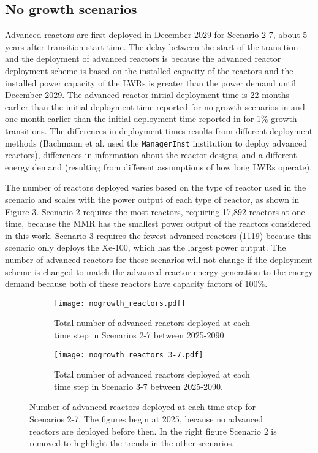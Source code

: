 \subsection{No growth scenarios} \label{sec:nogrowth_reactors}
Advanced reactors are first deployed in December 2029 for Scenario 2-7, 
about 5 years after transition start time. The delay between the start of 
the transition and the deployment of advanced reactors is because the 
advanced reactor deployment scheme is based on the installed capacity 
of the reactors and the
installed power capacity of the \glspl{LWR} is greater than the power demand
until December 2029. 
The advanced reactor initial deployment time is 
22 months earlier than the initial deployment time reported for no growth 
scenarios in 
\cite{bachmann_enrichment_2021} and one month earlier than the 
initial deployment time reported in \cite{bachmann_enrichment_2021}
for 1\% growth transitions. The differences in deployment times results 
from different deployment methods (Bachmann et al. used the \Cycamore 
\texttt{ManagerInst} institution to deploy advanced reactors), differences 
in information about the reactor designs, and a different energy demand 
(resulting from different assumptions of how long \glspl{LWR} operate). 

The number of reactors deployed varies based on 
the type of reactor used in the scenario and scales with the power output of 
each type of reactor, as shown in Figure \ref{fig:nogrowth_reactors}. Scenario
2 requires the most reactors, requiring 17,892 reactors at one time, 
because the \gls{MMR} has the smallest power output of the reactors 
considered in this work. Scenario 3 requires the fewest 
advanced reactors (1119) because this scenario only deploys the Xe-100,
which has the largest power output. The number of advanced reactors for 
these scenarios will not change if the deployment scheme is changed to 
match the advanced reactor energy generation to the energy demand because 
both of these reactors have capacity factors of 100\%. 

\begin{figure}
    \centering
    \begin{subfigure}[b]{0.45\textwidth}
        \centering
        \texttt{[image: nogrowth\_reactors.pdf]}
        \caption{Total number of advanced reactors deployed at 
        each time step in Scenarios 2-7 between 2025-2090.}
        \label{fig:nogrowth_reactors_all}
    \end{subfigure}
    \hfill
    \begin{subfigure}[b]{0.45\textwidth}
        \centering
        \texttt{[image: nogrowth\_reactors\_3-7.pdf]}
        \caption{Total number of advanced reactors deployed at 
        each time step in Scenario 3-7 between 2025-2090.}
        \label{fig:nogrowth_reactors_3-7}
    \end{subfigure}
       \caption{Number of advanced reactors deployed at each time step 
       for Scenarios 2-7. The figures begin at 2025, because no advanced 
       reactors are deployed before then. In the right figure Scenario 
       2 is removed to highlight the trends in the other scenarios.}
       \label{fig:nogrowth_reactors}
\end{figure}

